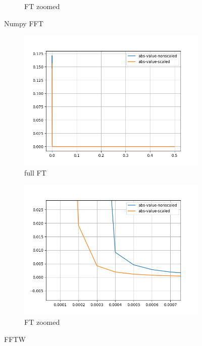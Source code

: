 \documentclass[12pt]{article}
\begin{document}
\begin{figure}[h]
\begin{subfigure}[h]{0.40\textwidth}
		\caption{FT zoomed}
	\end{subfigure}
	\caption{Numpy FFT}
	\centering
	\begin{subfigure}[h]{0.40\textwidth}
		\centering
		\includegraphics[width=\textwidth]{2/freq_domain_absolute_value_-_fftw-sinecardinal.png}
		\caption{full FT}
	\end{subfigure}
	\begin{subfigure}[h]{0.40\textwidth}
		\centering
		\includegraphics[width=\textwidth]{2/freq_domain_absolute_value_-_fftw-sinecardinalzoom.png}
		\caption{FT zoomed}
	\end{subfigure}
	\caption{FFTW}
\end{figure}
\end{document}
